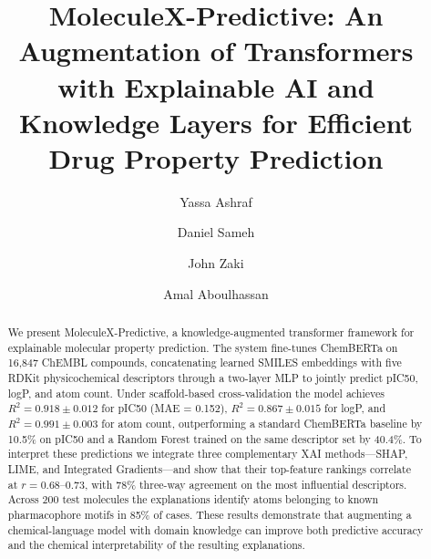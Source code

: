 \documentclass[preprint,12pt]{elsarticle}
\begin{document}
\begin{frontmatter}

\title{MoleculeX-Predictive: An Augmentation of Transformers with Explainable AI and Knowledge Layers for Efficient Drug Property Prediction}

\author[inst1]{Yassa Ashraf\fnmark[1]}
\author[inst1]{Daniel Sameh\fnmark[2]}
\author[inst1,inst2]{John Zaki\fnmark[3]}
\author[inst1]{Amal Aboulhassan\fnmark[4]}





            


\begin{abstract}
We present MoleculeX-Predictive, a knowledge-augmented transformer framework for explainable molecular property prediction. The system fine-tunes ChemBERTa on 16,847 ChEMBL compounds, concatenating learned SMILES embeddings with five RDKit physicochemical descriptors through a two-layer MLP to jointly predict pIC50, logP, and atom count. Under scaffold-based cross-validation the model achieves $R^2 = 0.918 \pm 0.012$ for pIC50 (MAE = 0.152), $R^2 = 0.867 \pm 0.015$ for logP, and $R^2 = 0.991 \pm 0.003$ for atom count, outperforming a standard ChemBERTa baseline by 10.5\% on pIC50 and a Random Forest trained on the same descriptor set by 40.4\%. To interpret these predictions we integrate three complementary XAI methods---SHAP, LIME, and Integrated Gradients---and show that their top-feature rankings correlate at $r = 0.68$--$0.73$, with 78\% three-way agreement on the most influential descriptors. Across 200 test molecules the explanations identify atoms belonging to known pharmacophore motifs in 85\% of cases. These results demonstrate that augmenting a chemical-language model with domain knowledge can improve both predictive accuracy and the chemical interpretability of the resulting explanations.


\end{abstract}
\end{frontmatter}
\end{document}
